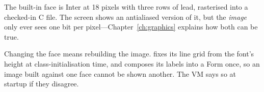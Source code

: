 The built-in face is Inter at 18 pixels with three rows of lead, rasterised
into a checked-in C file. The screen shows an antialiased version of it, but
the \emph{image} only ever sees one bit per pixel---Chapter~\ref{ch:graphics}
explains how both can be true.

\begin{stwarn}
Changing the face means rebuilding the image.  fixes its line
grid from the font's height at class-initialisation time, and 
composes its labels into a Form once, so an image built against one face
cannot be shown another. The VM says so at startup if they disagree.
\end{stwarn}
